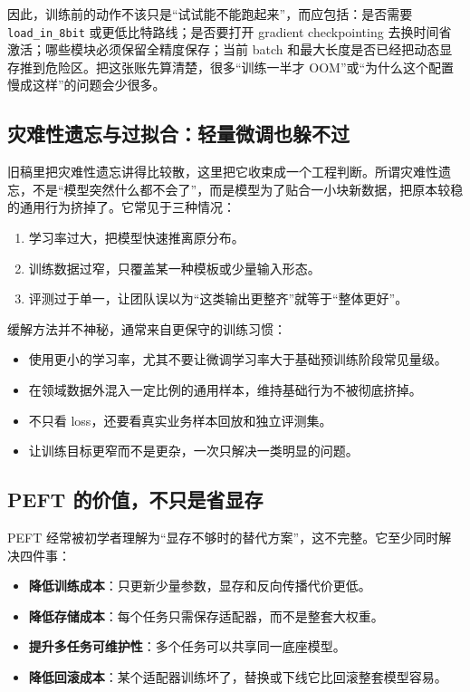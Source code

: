 因此，训练前的动作不该只是“试试能不能跑起来”，而应包括：是否需要 \texttt{load\_in\_8bit} 或更低比特路线；是否要打开 gradient checkpointing 去换时间省激活；哪些模块必须保留全精度保存；当前 batch 和最大长度是否已经把动态显存推到危险区。把这张账先算清楚，很多“训练一半才 OOM”或“为什么这个配置慢成这样”的问题会少很多。

\subsection{灾难性遗忘与过拟合：轻量微调也躲不过}
旧稿里把灾难性遗忘讲得比较散，这里把它收束成一个工程判断。所谓灾难性遗忘，不是“模型突然什么都不会了”，而是模型为了贴合一小块新数据，把原本较稳的通用行为挤掉了。它常见于三种情况：
\begin{enumerate}
  \item 学习率过大，把模型快速推离原分布。
  \item 训练数据过窄，只覆盖某一种模板或少量输入形态。
  \item 评测过于单一，让团队误以为“这类输出更整齐”就等于“整体更好”。
\end{enumerate}

缓解方法并不神秘，通常来自更保守的训练习惯：
\begin{itemize}
  \item 使用更小的学习率，尤其不要让微调学习率大于基础预训练阶段常见量级。
  \item 在领域数据外混入一定比例的通用样本，维持基础行为不被彻底挤掉。
  \item 不只看 loss，还要看真实业务样本回放和独立评测集。
  \item 让训练目标更窄而不是更杂，一次只解决一类明显的问题。
\end{itemize}

\subsection{PEFT 的价值，不只是省显存}
PEFT 经常被初学者理解为“显存不够时的替代方案”，这不完整。它至少同时解决四件事：
\begin{itemize}
  \item \textbf{降低训练成本}：只更新少量参数，显存和反向传播代价更低。
  \item \textbf{降低存储成本}：每个任务只需保存适配器，而不是整套大权重。
  \item \textbf{提升多任务可维护性}：多个任务可以共享同一底座模型。
  \item \textbf{降低回滚成本}：某个适配器训练坏了，替换或下线它比回滚整套模型容易。
\end{itemize}

